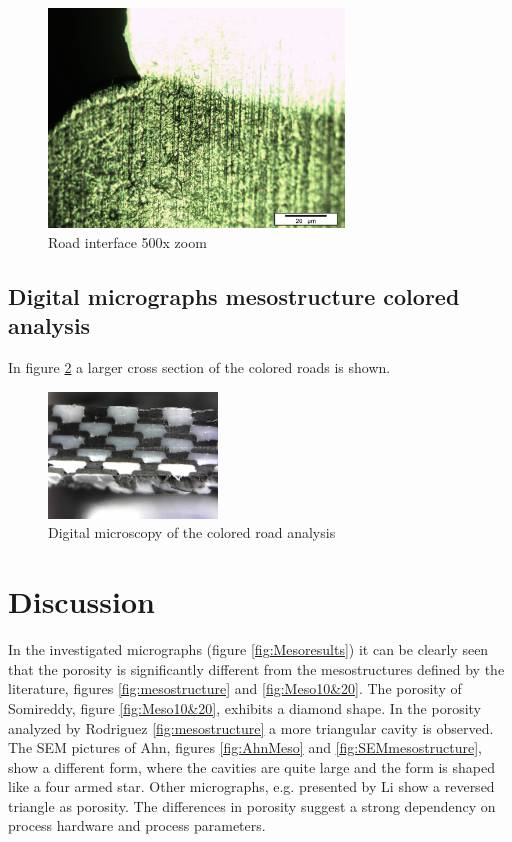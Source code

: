 \begin{figure}[htb]
    \centering
    \includegraphics[width=0.70\textwidth]{chapter_4_RVE_Definition/figures/colored/Tv89_LI.jpg}
    \caption{Road interface 500x zoom}
    \label{fig:colored500x}
\end{figure}

\subsection{Digital micrographs  mesostructure colored analysis}

In figure \ref{fig:digitalcolored} a larger cross section of the colored roads is shown.
\begin{figure}[htb]
    \centering
    \includegraphics[width=0.40\textwidth]{chapter_4_RVE_Definition/figures/colored/Digitalcolored.jpg}
    \caption{Digital microscopy of the colored road analysis}
    \label{fig:digitalcolored}
\end{figure}

\section{Discussion}

In the investigated micrographs (figure \ref{fig:Mesoresults}) it can be clearly seen that the porosity is significantly different from the mesostructures defined by the literature, figures \ref{fig:mesostructure} and \ref{fig:Meso10&20}. The porosity of Somireddy, figure \ref{fig:Meso10&20}, exhibits a diamond shape. In the porosity analyzed by Rodriguez \ref{fig:mesostructure} a more triangular cavity is observed. The SEM pictures of Ahn, figures \ref{fig:AhnMeso} and \ref{fig:SEMmesostructure}, show a different form, where the cavities are quite large and the form is shaped like a four armed star. Other micrographs, e.g. presented by Li \cite{Li2002CompositeProperties} show a reversed triangle as porosity. The differences in porosity suggest a strong dependency on  process hardware and process parameters.

